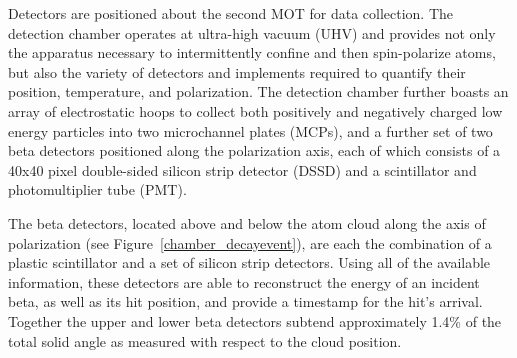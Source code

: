 Detectors are positioned about the second MOT for data collection.  The detection chamber 
operates at ultra-high vacuum (UHV) and provides not only the apparatus necessary to intermittently confine and then spin-polarize atoms, but also the variety of detectors and implements required to quantify their position, temperature, and polarization.  The detection chamber further boasts an array of electrostatic hoops to collect both positively and negatively charged low energy particles into two microchannel plates (MCPs),  and a further set of two beta detectors positioned along the polarization axis, each of which consists of a 40x40 pixel double-sided silicon strip detector (DSSD) and a scintillator and photomultiplier tube (PMT).  %




The beta detectors, located above and below the atom cloud along the axis of polarization (see Figure~\ref{chamber_decayevent}), are each the combination of a plastic scintillator and a set of silicon strip detectors.  Using all of the available information, these detectors are able to reconstruct the energy of an incident beta, as well as its hit position, and provide a timestamp for the hit's arrival.  Together the upper and lower beta detectors subtend approximately 1.4\% of the total solid angle as measured with respect to the cloud position. 

